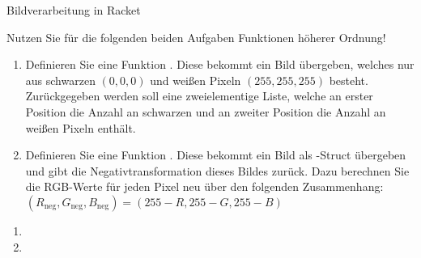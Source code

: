\documentclass{../preamble}
\begin{document}
\begin{task}[credit = \stars{3}{3}]{Bildverarbeitung in Racket}
\begin{itemize}
    \end{itemize}
    Nutzen Sie für die folgenden beiden Aufgaben Funktionen höherer Ordnung!
    \begin{enumerate}
        \item Definieren Sie eine Funktion . Diese bekommt ein Bild übergeben, welches nur aus schwarzen \((0,0,0)\) und weißen Pixeln \((255,255,255)\) besteht. Zurückgegeben werden soll eine zweielementige Liste, welche an erster Position die Anzahl an schwarzen und an zweiter Position die Anzahl an weißen Pixeln enthält.
        \item Definieren Sie eine Funktion . Diese bekommt ein Bild als -Struct übergeben und gibt die Negativtransformation dieses Bildes zurück. Dazu berechnen Sie die RGB-Werte für jeden Pixel neu über den folgenden Zusammenhang: \((R_{\text{neg}}, G_{\text{neg}}, B_{\text{neg}}) = (255 - R, 255 - G, 255 - B)\)
    \end{enumerate}

    \clearpage

    \begin{solution}
        \begin{enumerate}
            \item\hfill
                  
            \item\hfill
                  
        \end{enumerate}
    \end{solution}
\end{task}
\end{document}
